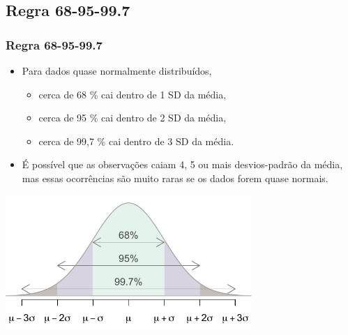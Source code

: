 \begin{frame}
\end{frame}


\subsection{Regra 68-95-99.7}


\begin{frame}
\frametitle{Regra 68-95-99.7}

\begin{itemize}
\justifying
\item Para dados quase normalmente distribuídos, 
\begin{itemize}
\justifying
\item cerca de 68 \% cai dentro de 1 SD da média,
\justifying
\item cerca de 95 \% cai dentro de 2 SD da média,
\justifying
\item cerca de 99,7 \% cai dentro de 3 SD da média.
\end{itemize}
\justifying
\item É possível que as observações caiam 4, 5 ou mais desvios-padrão da média, mas essas ocorrências são muito raras se os dados forem quase normais.

\end{itemize}

\begin{center}
\includegraphics[width=0.7\textwidth]{3-1_normal_distribution/6895997.pdf}
\end{center}

\end{frame}


